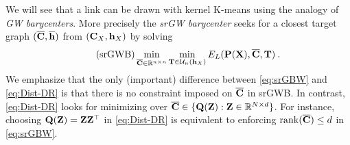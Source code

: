 We will see that a link can be drawn with kernel K-means using the analogy of \emph{GW barycenters}. More precisely the \emph{srGW barycenter} \citep{vincent2021semi} seeks for a closest target graph $(\overline{{\mathbf{C}}}, \overline{{\mathbf{h}}})$ from $({\mathbf{C}}_X, {\mathbf{h}}_X)$ by solving
\begin{equation}\tag{srGWB}\label{eq:srGBW}
	\min_{\overline{{\mathbf{C}}} \in \mathbb{R}^{n \times n}} \min_{{\mathbf{T}} \in \mathcal{U}_n({\mathbf{h}}_X)} E_L({\mathbf{P}}({\mathbf{X}}), \overline{{\mathbf{C}}}, {\mathbf{T}}) \:.
\end{equation} 
We emphasize that the only (important) difference between \cref{eq:srGBW} and
\cref{eq:Dist-DR} is that there is no constraint imposed on $\overline{{\mathbf{C}}}$ in
srGWB. In contrast, \cref{eq:Dist-DR} looks for minimizing over $\overline{{\mathbf{C}}}
\in \{{\mathbf{Q}}({\mathbf{Z}}): {\mathbf{Z}} \in \mathbb{R}^{N \times d}\}$. For instance, choosing ${\mathbf{Q}}({\mathbf{Z}}) = {\mathbf{Z}} {\mathbf{Z}}^\top$ in \cref{eq:Dist-DR} is
equivalent to enforcing $\operatorname{rank}(\overline{{\mathbf{C}}}) \leq d$ in
\cref{eq:srGBW}.

